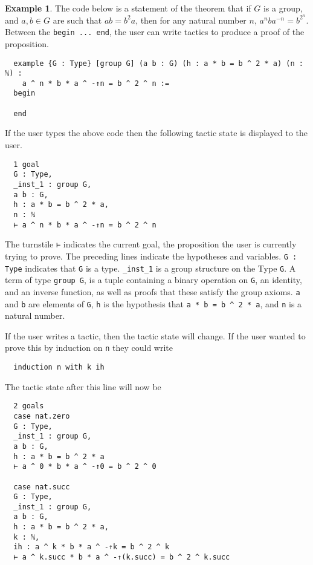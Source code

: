 \documentclass[11pt]{article} %
\theoremstyle{definition}
\theoremstyle{definition}
\theoremstyle{definition}
\theoremstyle{definition}
\theoremstyle{definition}
\theoremstyle{definition}
\newtheorem{exmpl}{Example}[theorem]
\begin{document}
\begin{exmpl}

The code below is a statement of the theorem that if $G$ is a group, and
$a, b ∈ G$ are such that $ab = b^2a$, then for any natural number $n$,
$a^nba^{-n} = b^{2^n}$. Between the \lstinline{begin ... end}, the user can
write tactics to produce a proof of the proposition.

\begin{lstlisting}
  example {G : Type} [group G] (a b : G) (h : a * b = b ^ 2 * a) (n : ℕ) :
    a ^ n * b * a ^ -↑n = b ^ 2 ^ n :=
  begin

  end
\end{lstlisting}
If the user types the above code then the following tactic state is displayed to the user.

\begin{lstlisting}
  1 goal
  G : Type,
  _inst_1 : group G,
  a b : G,
  h : a * b = b ^ 2 * a,
  n : ℕ
  ⊢ a ^ n * b * a ^ -↑n = b ^ 2 ^ n
\end{lstlisting}

The turnstile \lstinline{⊢} indicates the current goal, the proposition the user
is currently trying to prove. The preceding lines indicate the hypotheses and variables.
\lstinline{G : Type} indicates that \lstinline{G} is a type. \lstinline{_inst_1} is a group structure on the Type \lstinline{G}.
A term of type \lstinline{group G}, is a tuple containing a binary operation on
\lstinline{G}, an identity, and an inverse function, as well as proofs that these
satisfy the group axioms. \lstinline{a} and \lstinline{b} are elements of
\lstinline{G}, \lstinline{h} is the hypothesis that \lstinline{a * b = b ^ 2 * a},
and \lstinline{n} is a natural number.

If the user writes a tactic, then the tactic state will change. If the user
wanted to prove this by induction on \lstinline{n} they could write

\begin{lstlisting}
  induction n with k ih
\end{lstlisting}

The tactic state after this line will now be

\begin{lstlisting}
  2 goals
  case nat.zero
  G : Type,
  _inst_1 : group G,
  a b : G,
  h : a * b = b ^ 2 * a
  ⊢ a ^ 0 * b * a ^ -↑0 = b ^ 2 ^ 0

  case nat.succ
  G : Type,
  _inst_1 : group G,
  a b : G,
  h : a * b = b ^ 2 * a,
  k : ℕ,
  ih : a ^ k * b * a ^ -↑k = b ^ 2 ^ k
  ⊢ a ^ k.succ * b * a ^ -↑(k.succ) = b ^ 2 ^ k.succ
\end{lstlisting}


\end{exmpl}
\end{document}

